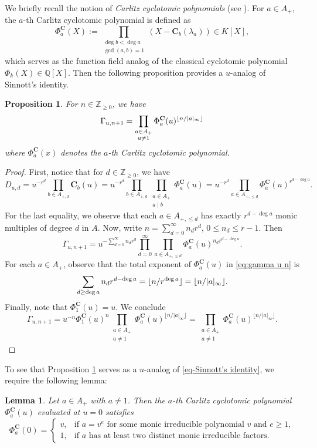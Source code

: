 \documentclass[12pt,reqno]{amsart}
\numberwithin{equation}{section}
\theoremstyle{plain}
\newtheorem{lem}[thm]{Lemma}
\newtheorem{prop}[thm]{Proposition}
\theoremstyle{definition}
\theoremstyle{remark}
\newcommand{\ZZ}{\mathbb{Z}}
\newcommand{\QQ}{\mathbb{Q}}
\DeclarePairedDelimiter\floor{\lfloor}{\rfloor}
\newcommand{\C}{\mathbf{C}}
\begin{document}
We briefly recall the notion of \textit{Carlitz cyclotomic polynomials} (see \cite[Definition 7.1.4]{Papikian2023}). For $a\in A_+$, the $a$-th Carlitz cyclotomic polynomial is defined as $$\Phi^\C_a(X):=\prod_{\substack{\deg b<\deg a\\\gcd(a,b)=1}}(X-\C_b(\lambda_a))\in K[X],$$
which serves as the function field analog of the classical cyclotomic polynomial $\Phi_k(X)\in\QQ[X]$. Then the following proposition provides a $u$-analog of Sinnott's identity.
\begin{prop}\label{prop-u-analog-Sinnott}
    For $n\in\ZZ_{\geq 0}$, we have
    $$\Gamma_{u,n+1}=\prod_{\substack{a\in A_+\\a\neq 1}}\Phi^{\C}_a(u)^{\floor{n/|a|_\infty}}$$
    where $\Phi^{\C}_a(x)$ denotes the $a$-th Carlitz cyclotomic polynomial.
\end{prop}
\begin{proof}
    First, notice that for $d\in\ZZ_{\geq 0}$, we have
    $$
    D_{u,d}=u^{-r^d}\prod_{b\in A_{+,d}}\C_b(u)=u^{-r^d}\prod_{b\in A_{+,d}}\prod_{\substack{a\in A_+\\a\mid b}}\Phi^{\C}_a(u)=u^{-r^d}\prod_{a\in A_{+,\leq d}}\Phi^{\C}_a(u)^{r^{d-\deg a}}.
    $$
    For the last equality, we observe that each $a \in A_{+,\leq d}$ has exactly $r^{d-\deg a}$ monic multiples of degree $d$ in $A$.
    Now, write $n=\sum_{d=0}^\infty n_dr^d$, $0\leq n_d\leq r-1$. 
    Then
    \begin{equation}\label{eq:gamma u n}
        \Gamma_{u,n+1}
                    = u^{-\sum_{d=0}^\infty n_d r^d} \prod_{d=0}^\infty \prod_{a \in A_{+,\le d}} \Phi^{\C}_a(u)^{n_d r^{d-\deg a}}.
    \end{equation}
   For each $a\in A_+$, observe that the total exponent of $\Phi^{\C}_a(u)$ in \eqref{eq:gamma u n} is
    \[
    \sum_{d \ge \deg a} n_d r^{d-\deg a}=\floor{n/r^{\deg a}}=\floor{n/|a|_\infty}.
    \]
    Finally, note that $\Phi^{\C}_1(u)=u$. 
    We conclude
    \[
    \Gamma_{u,n+1} = u^{-n}\Phi^{\C}_1(u)^n \prod_{\substack{a \in A_+\\a\neq 1}} \Phi^{\C}_a(u)^{\lfloor n / |a|_\infty \rfloor}=\prod_{\substack{a \in A_+\\a\neq 1}} \Phi^{\C}_a(u)^{\lfloor n / |a|_\infty \rfloor}.
    \]
\end{proof}

To see that Proposition \ref{prop-u-analog-Sinnott} serves as a $u$-analog of \eqref{eq-Sinnott's identity}, we require the following lemma:
\begin{lem} \label{lem-cyclotomic-zero}
    Let $a \in A_+$ with $a \neq 1$. Then the $a$-th Carlitz cyclotomic polynomial $\Phi^{\C}_a(u)$ evaluated at $u=0$ satisfies
    \[
    \Phi^{\C}_a(0) = 
    \begin{cases} 
        v, & \text{if } a = v^e \text{ for some monic irreducible polynomial } v \text{ and } e \ge 1, \\
        1, & \text{if } a \text{ has at least two distinct monic irreducible factors.}
    \end{cases}
    \]
\end{lem}
\end{document}
